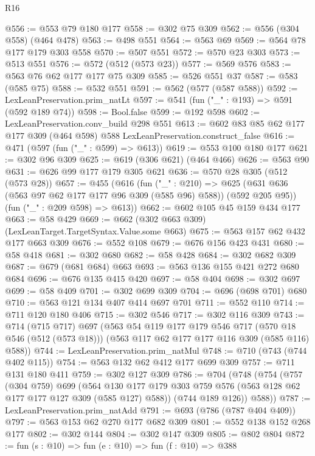 \begin{lexlean}{R16}
\begin{coremodule}
@556 := @553 @79 @180 @177
@558 := @302 @75 @309
@562 := @556 (@304 @558) (@464 @478)
@563 := @498 @551
@564 := @563 @69
@569 := @564 @78 @177 @179 @303 @558
@570 := @507 @551
@572 := @570 @23 @303
@573 := @513 @551
@576 := @572 (@512 (@573 @23))
@577 := @569 @576
@583 := @563 @76 @62 @177 @177 @75 @309
@585 := @526 @551 @37
@587 := @583 (@585 @75)
@588 := @532 @551
@591 := @562 (@577 (@587 @588))
@592 := LexLeanPreservation.prim_natLt
@597 := @541 (fun ("_" : @193) => @591 (@592 @189 @74))
@598 := Bool.false
@599 := @192 @598
@602 := LexLeanPreservation.conv_build @298 @551
@613 := @602 @83 @85 @62 @177 @177 @309 (@464 @598) @588 LexLeanPreservation.construct_false
@616 := @471 (@597 (fun ("_" : @599) => @613))
@619 := @553 @100 @180 @177
@621 := @302 @96 @309
@625 := @619 (@306 @621) (@464 @466)
@626 := @563 @90
@631 := @626 @99 @177 @179 @305 @621
@636 := @570 @28 @305 (@512 (@573 @28))
@657 := @455
    (@616
      (fun ("_" : @210) =>
      @625 (@631 @636 (@563 @97 @62 @177 @177 @96 @309 (@585 @96) @588)) (@592 @205 @95))
      (fun ("_" : @209 @598) => @613))
@662 := @602 @105 @45 @159 @434 @177
@663 := @58 @429
@669 := @662 (@302 @663 @309) (LexLeanTarget.TargetSyntax.Value.some @663)
@675 := @563 @157 @62 @432 @177 @663 @309
@676 := @552 @108
@679 := @676 @156 @423 @431
@680 := @58 @418
@681 := @302 @680
@682 := @58 @428
@684 := @302 @682 @309
@687 := @679 (@681 @684) @663
@693 := @563 @136 @155 @421 @272 @680 @684
@696 := @676 @135 @415 @420
@697 := @58 @404
@698 := @302 @697
@699 := @58 @409
@701 := @302 @699 @309
@704 := @696 (@698 @701) @680
@710 := @563 @121 @134 @407 @414 @697 @701
@711 := @552 @110
@714 := @711 @120 @180 @406
@715 := @302 @546
@717 := @302 @116 @309
@743 := @714
    (@715 @717)
    @697
    (@563
      @54
      @119
      @177
      @179
      @546
      @717
      (@570 @18 @546 (@512 (@573 @18)))
      (@563 @117 @62 @177 @177 @116 @309 (@585 @116) @588))
@744 := LexLeanPreservation.prim_natMul
@748 := @710 (@743 (@744 @402 @115))
@754 := @563 @132 @62 @412 @177 @699 @309
@757 := @711 @131 @180 @411
@759 := @302 @127 @309
@786 := @704
    (@748
      (@754
        (@757
          (@304 @759)
          @699
          (@564 @130 @177 @179 @303 @759 @576 (@563 @128 @62 @177 @177 @127 @309 (@585 @127) @588))
          (@744 @189 @126))
        @588))
@787 := LexLeanPreservation.prim_natAdd
@791 := @693 (@786 (@787 @404 @409))
@797 := @563 @153 @62 @270 @177 @682 @309
@801 := @552 @138 @152 @268 @177
@802 := @302 @144
@804 := @302 @147 @309
@805 := @802 @804
@872 := fun (s : @10) =>
  fun (e : @10) =>
  fun (f : @10) =>
  @388

\end{coremodule}
\end{lexlean}

